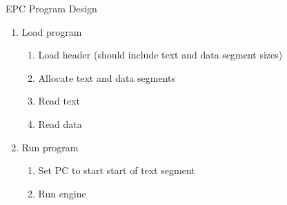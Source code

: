 \documentclass[11pt]{article}
\begin{document}
\begin{center}
EPC Program Design
\end{center}

\begin{enumerate}
\item   Load program
    \begin{enumerate}
    \item   Load header (should include text and data segment sizes)
    \item   Allocate text and data segments
    \item   Read text
    \item   Read data
    \end{enumerate}
    
\item   Run program
    \begin{enumerate}
    \item   Set PC to start start of text segment
    \item   Run engine
    \end{enumerate}
    
\end{enumerate}
\end{document}
